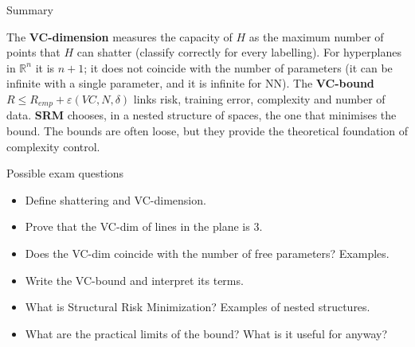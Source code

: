 \begin{boxabstract}{Summary}

The \textbf{VC-dimension} measures the capacity of \(H\) as the maximum
number of points that \(H\) can shatter (classify correctly for every
labelling). For hyperplanes in \(\mathbb{R}^n\) it is \(n+1\); it does
not coincide with the number of parameters (it can be infinite with a
single parameter, and it is infinite for NN). The \textbf{VC-bound}
\(R \le R_{emp} + \varepsilon(VC, N, \delta)\) links risk, training
error, complexity and number of data. \textbf{SRM} chooses, in a nested
structure of spaces, the one that minimises the bound. The bounds are
often loose, but they provide the theoretical foundation of complexity
control.

\end{boxabstract}

\begin{boxquestion}{Possible exam questions}

\begin{itemize}
\tightlist
\item
  Define shattering and VC-dimension.
\item
  Prove that the VC-dim of lines in the plane is 3.
\item
  Does the VC-dim coincide with the number of free parameters?
  Examples.
\item
  Write the VC-bound and interpret its terms.
\item
  What is Structural Risk Minimization? Examples of nested structures.
\item
  What are the practical limits of the bound? What is it useful for
  anyway?
\end{itemize}

\end{boxquestion}
